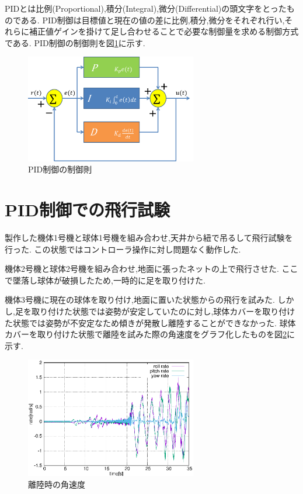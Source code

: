 \documentclass[12pt,oneside]{sotsuken_paper}
\begin{document}
PIDとは比例(Proportional),積分(Integral),微分(Differential)の頭文字をとったものである.
PID制御は目標値と現在の値の差に比例,積分,微分をそれぞれ行い,それらに補正値ゲインを掛けて足し合わせることで必要な制御量を求める制御方式である.\cite{pid}
PID制御の制御則を図\ref{fig:PID}に示す.

\begin{figure}[htbp]
	\begin{center}
		\includegraphics[width=75mm]{image/susiki/PID.png}
		\caption{PID制御の制御則}
		\label{fig:PID}
	\end{center}
\end{figure}

\section{PID制御での飛行試験}
製作した機体1号機と球体1号機を組み合わせ,天井から紐で吊るして飛行試験を行った.
この状態ではコントローラ操作に対し問題なく動作した.

機体2号機と球体2号機を組み合わせ,地面に張ったネットの上で飛行させた.
ここで墜落し球体が破損したため,一時的に足を取り付けた.

機体3号機に現在の球体を取り付け,地面に置いた状態からの飛行を試みた.
しかし,足を取り付けた状態では姿勢が安定していたのに対し,球体カバーを取り付けた状態では姿勢が不安定なため傾きが発散し離陸することができなかった.
球体カバーを取り付けた状態で離陸を試みた際の角速度をグラフ化したものを図\ref{fig:test-1}に示す.

\begin{figure}[htbp]
	\begin{center}
		\includegraphics[width=75mm]{image/test-1.eps}
		\caption{離陸時の角速度}
		\label{fig:test-1}
	\end{center}
\end{figure}
\end{document}
